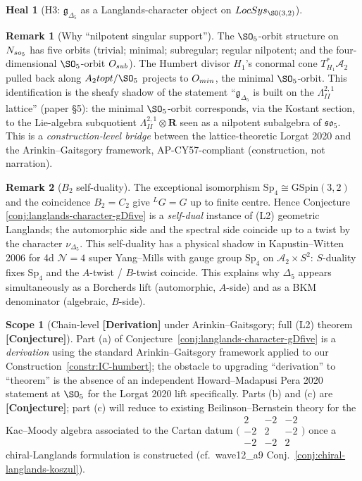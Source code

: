 \documentclass[11pt]{amsart}
\theoremstyle{definition}
\newtheorem{heal}[attack]{Heal}
\newtheorem{scope}[theorem]{Scope}
\newtheorem{remark}{Remark}
\providecommand{\LocSys}{\mathrm{LocSys}}
\providecommand{\GSpin}{\mathrm{GSpin}}
\providecommand{\Sp}{\mathrm{Sp}}
\providecommand{\LG}{{}^L G}
\providecommand{\fso}{\mathfrak{so}}
\providecommand{\cO}{\mathcal{O}}
\providecommand{\bR}{\mathbf{R}}
\providecommand{\Dfive}{\Delta_5}
\providecommand{\gDfive}{\mathfrak{g}_{\Dfive}}
\providecommand{\ClaimStatusConjectured}{\textbf{[Conjecture]}}
\begin{document}
\begin{heal}[H3: $\gDfive$ as a Langlands-character object on
$\LocSys_{\SO(3,2)}$]
\begin{remark}[Why ``nilpotent singular support'']
The $\SO_5$-orbit structure on $\cN_{\fso_5}$ has five orbits
(trivial; minimal; subregular; regular nilpotent; and the
four-dimensional $\SO_5$-orbit $\cO_{\rm sub}$). The Humbert divisor
$H_1$'s conormal cone $T^*_{H_1}\mathcal{A}_2$ pulled back along
$\mathcal{A}_2 \to \mathrm{pt}/\SO_5$ projects to $\cO_{\rm min}$,
the minimal $\SO_5$-orbit. This identification is the sheafy
shadow of the statement ``$\gDfive$ is built on the
$\Lambda^{2,1}_{II}$ lattice'' (paper \S 5): the minimal $\SO_5$-orbit
corresponds, via the Kostant section, to the Lie-algebra subquotient
$\Lambda^{2,1}_{II} \otimes \bR$ seen as a nilpotent subalgebra of
$\fso_5$. This is a \emph{construction-level bridge} between the
lattice-theoretic Lorgat 2020 and the Arinkin--Gaitsgory framework,
AP-CY57-compliant (construction, not narration).
\end{remark}

\begin{remark}[$B_2$ self-duality]
The exceptional isomorphism
$\Sp_4 \cong \GSpin(3,2)$ and the coincidence $B_2 = C_2$ give
$\LG = G$ up to finite centre. Hence Conjecture
\ref{conj:langlands-character-gDfive} is a \emph{self-dual} instance
of (L2) geometric Langlands; the automorphic side and the spectral
side coincide up to a twist by the character $\nu_{\Dfive}$. This
self-duality has a physical shadow in Kapustin--Witten 2006 for 4d
$\mathcal{N}=4$ super Yang--Mills with gauge group $\Sp_4$ on
$\mathcal{A}_2 \times S^2$: $S$-duality fixes $\Sp_4$ and the
$A$-twist / $B$-twist coincide.  This explains why $\Dfive$ appears
simultaneously as a Borcherds lift (automorphic, $A$-side) and as a
BKM denominator (algebraic, $B$-side).
\end{remark}

\begin{scope}[Chain-level \textbf{[Derivation]} under Arinkin--Gaitsgory;
full (L2) theorem \textbf{[Conjecture]}]
Part (a) of Conjecture~\ref{conj:langlands-character-gDfive} is a
\emph{derivation} using the standard Arinkin--Gaitsgory framework
applied to our Construction~\ref{constr:IC-humbert}; the obstacle to
upgrading ``derivation'' to ``theorem'' is the absence of an
independent Howard--Madapusi Pera 2020 statement at
$\SO_5$ for the Lorgat 2020 lift specifically. Parts (b) and (c) are
\ClaimStatusConjectured; part (c) will reduce to existing
Beilinson--Bernstein theory for the Kac--Moody algebra associated to
the Cartan datum $\bigl(\begin{smallmatrix}2 & -2 & -2 \\ -2 & 2 & -2
\\ -2 & -2 & 2\end{smallmatrix}\bigr)$ once a chiral-Langlands
formulation is constructed (cf.\ wave12\_a9 Conj.~\ref{conj:chiral-langlands-koszul}).
\end{scope}
\end{heal}
\end{document}
